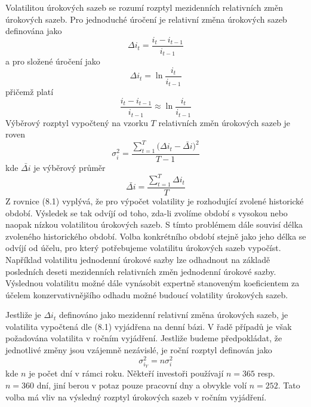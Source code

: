 \documentclass[a4paper]{book}
\begin{document}
Volatilitou úrokových sazeb se rozumí rozptyl mezidenních relativních změn úrokových sazeb. Pro jednoduché úročení je relativní změna úrokových sazeb definována jako
\begin{equation*}
\Delta i_t = \frac{i_t - i_{t-1}}{i_{t-1}}
\end{equation*}
a pro složené úročení jako
\begin{equation*}
\Delta i_t = \ln \frac{i_t}{i_{t-1}}
\end{equation*}
přičemž platí
\begin{equation*}
\frac{i_t - i_{t-1}}{i_{t-1}} \approx \ln \frac{i_t}{i_{t-1}}
\end{equation*}
Výběrový rozptyl vypočtený na vzorku $T$ relativních změn úrokových sazeb je roven
\begin{equation}
\sigma^2_i = \frac{\sum_{t=1}^T \Big( \Delta i_t - \bar{\Delta i} \Big)^2}{T - 1}
\end{equation}
kde $\bar{\Delta i}$ je výběrový průměr
\begin{equation}
\bar{\Delta i} = \frac{\sum_{t=1}^T \Delta i_t}{T}
\end{equation}
Z rovnice (8.1) vyplývá, že pro výpočet volatility je rozhodující zvolené historické období. Výsledek se tak odvíjí od toho, zda-li zvolíme období s vysokou nebo naopak nízkou volatilitou úrokových sazeb. S tímto problémem dále souvisí délka zvoleného historického období. Volba konkrétního období stejně jako jeho délka se odvíjí od účelu, pro který potřebujeme volatilitu úrokových sazeb vypočíst. Například volatilitu jednodenní úrokové sazby lze odhadnout na základě posledních deseti mezidenních relativních změn jednodenní úrokové sazby. Výslednou volatilitu možné dále vynásobit expertně stanoveným koeficientem za účelem konzervativnějšího odhadu možné budoucí volatility úrokových sazeb.

Jestliže je $\Delta i_t$ definováno jako mezidenní relativní změna úrokových sazeb, je volatilita vypočtená dle (8.1) vyjádřena na denní bázi. V řadě případů je však požadována volatilita v ročním vyjádření. Jestliže budeme předpokládat, že jednotlivé změny jsou vzájemně nezávislé, je roční rozptyl definován jako
\begin{equation*}
\sigma^2_{i_Y} = n \sigma^2_i
\end{equation*}
kde $n$ je počet dní v rámci roku. Někteří investoři používají $n = 365$ resp. $n = 360$ dní, jiní berou v potaz pouze pracovní dny a obvykle volí $n = 252$. Tato volba má vliv na výsledný rozptyl úrokových sazeb v ročním vyjádření.
\end{document}
